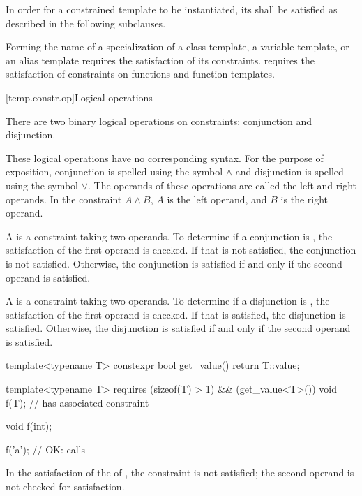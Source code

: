 \pnum
In order for a constrained template to be instantiated,
its 
shall be satisfied as described in the following subclauses.
\begin{note}
Forming the name of a specialization of
a class template,
a variable template, or
an alias template
requires the satisfaction of its constraints.
requires the satisfaction of constraints
on functions and function templates.
\end{note}

[temp.constr.op]{Logical operations}

\pnum
There are two binary logical operations on constraints: conjunction
and disjunction.
\begin{note}
These logical operations have no corresponding \Cpp{} syntax.
For the purpose of exposition, conjunction is spelled
using the symbol $\land$ and disjunction is spelled using the
symbol $\lor$.
The operands of these operations are called the left
and right operands. In the constraint $A \land B$,
$A$ is the left operand, and $B$ is the right operand.
\end{note}

\pnum
A  is a constraint taking two
operands.
To determine if a conjunction is
,
the satisfaction of
the first operand is checked.
If that is not satisfied, the conjunction is not satisfied.
Otherwise, the conjunction is satisfied if and only if the second
operand is satisfied.

\pnum
A  is a constraint taking two
operands.
%
To determine if a disjunction is
,
the satisfaction of
the first operand is checked.
If that is satisfied, the disjunction is satisfied.
Otherwise, the disjunction is satisfied if and only if the second
operand is satisfied.

\pnum
\begin{example}
\begin{codeblock}
template<typename T>
  constexpr bool get_value() { return T::value; }

template<typename T>
  requires (sizeof(T) > 1) && (get_value<T>())
    void f(T);      // has associated constraint 

void f(int);

f('a'); // OK: calls 
\end{codeblock}
In the satisfaction of the 
of , the constraint  is not satisfied;
the second operand is not checked for satisfaction.
\end{example}

